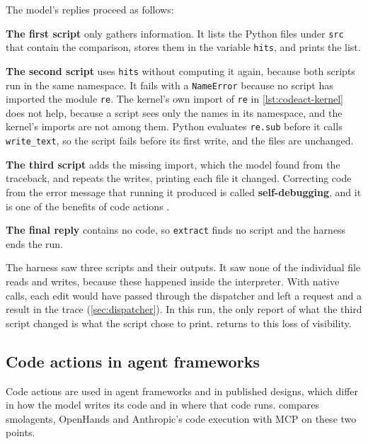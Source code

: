 The model's replies proceed as follows:
\bi
\item \textbf{The first script} only gathers information. It lists the Python files under
\texttt{src} that contain the comparison, stores them in the variable \texttt{hits}, and prints the
list.
\item \textbf{The second script} uses \texttt{hits} without computing it again, because both
scripts run in the same namespace. It fails with a \texttt{NameError} because no script has
imported the module \texttt{re}. The kernel's own import of \texttt{re} in \cref{lst:codeact-kernel}
does not help, because a script sees only the names in its namespace, and the kernel's imports are
not among them. Python evaluates \texttt{re.sub} before it calls \texttt{write\_text}, so the script
fails before its first write, and the files are unchanged.
\item \textbf{The third script} adds the missing import, which the model found from the traceback,
and repeats the writes, printing each file it changed. Correcting code from the error message that
running it produced is called \textbf{self-debugging}, and it is one of the benefits of code
actions \citep{wang2024codeact}.
\item \textbf{The final reply} contains no code, so \texttt{extract} finds no script and the harness
ends the run.
\ei

The harness saw three scripts and their outputs. It saw none of the individual file reads and
writes, because these happened inside the interpreter. With native calls, each edit would have
passed through the dispatcher and left a request and a result in the trace
(\cref{sec:dispatcher}). In this run, the only report of what the third script changed is what the
script chose to print.  returns to this loss of visibility.

\subsection{Code actions in agent frameworks}
\label{sec:codeact-frameworks}

Code actions are used in agent frameworks and in published designs, which differ in how the model
writes its code and in where that code runs.  compares smolagents,
OpenHands and Anthropic's code execution with MCP on these two points.

